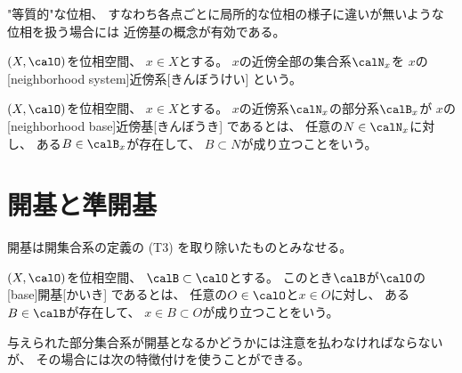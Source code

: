 \documentclass[report]{jlreq}
\begin{document}
"等質的"な位相、
すなわち各点ごとに局所的な位相の様子に違いが無いような位相を扱う場合には
近傍基の概念が有効である。

\begin{definition}[近傍]
    \TODO{}
\end{definition}

\begin{definition}[近傍系]
    $(X, \calO)$を位相空間、
    $x \in X$とする。
    $x$の近傍全部の集合系$\calN_x$を
    $x$の[neighborhood system]{近傍系}[きんぼうけい]
    という。
\end{definition}

\begin{definition}[近傍基]
    $(X, \calO)$を位相空間、
    $x \in X$とする。
    $x$の近傍系$\calN_x$の部分系$\calB_x$が
    $x$の[neighborhood base]{近傍基}[きんぼうき]
    であるとは、
    任意の$N \in \calN_x$に対し、
    ある$B \in \calB_x$が存在して、
    $B \subset N$が成り立つことをいう。
\end{definition}


\begin{definition}[第1可算]
    \TODO{}
\end{definition}

%
\section{開基と準開基}

開基は開集合系の定義の (T3) を取り除いたものとみなせる。

\begin{definition}[開基]
    $(X, \calO)$を位相空間、
    $\calB \subset \calO$とする。
    このとき$\calB$が$\calO$の
    [base]{開基}[かいき]
    であるとは、
    任意の$O \in \calO$と$x \in O$に対し、
    ある$B \in \calB$が存在して、
    $x \in B \subset O$が成り立つことをいう。
\end{definition}

与えられた部分集合系が開基となるかどうかには注意を払わなければならないが、
その場合には次の特徴付けを使うことができる。

\begin{proposition}[開基の特徴付け]
    \label[proposition]{prop:open-base-characterization}
    \TODO{}
\end{proposition}
\end{document}
